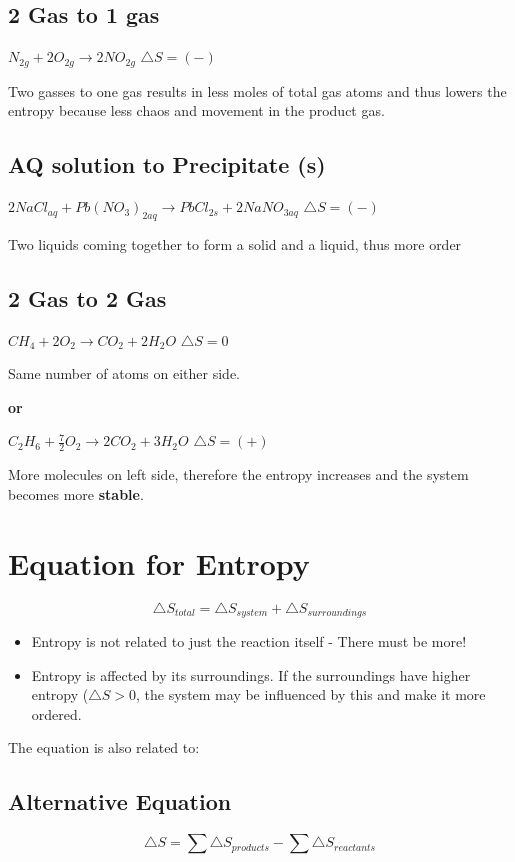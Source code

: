 \documentclass[12pt]{article} %
\begin{document}
\subsection{2 Gas to 1 gas}

$N_{2g} + 2O_{2g} \rightarrow 2NO_{2g}$
$\triangle{S} = (-)$

Two gasses to one gas results in less moles of total gas atoms and thus lowers the entropy because less chaos and movement in the product gas.

\subsection{AQ solution to Precipitate (s)}

$2NaCl_{aq} + Pb(NO_3)_{2aq} \rightarrow PbCl_{2s} + 2NaNO_{3aq}$
$\triangle{S} = (-)$

Two liquids coming together to form a solid and a liquid, thus more order

\subsection{2 Gas to 2 Gas}

$CH_4 + 2O_2 \rightarrow CO_2 + 2H_2O$
$\triangle{S} = 0$

Same number of atoms on either side.

\textbf{or}

$C_2H_6 + \frac{7}{2}O_2 \rightarrow 2CO_2 + 3H_2O$
$\triangle{S} = (+)$

More molecules on left side, therefore the entropy increases and the system becomes more \textbf{stable}.

\pagebreak

\section{Equation for Entropy}

$$\triangle{S}_{total} = \triangle{S}_{system} + \triangle{S}_{surroundings}$$

\begin{itemize}
\item Entropy is not related to just the reaction itself - There must be more!
\item Entropy is affected by its surroundings. If the surroundings have higher entropy ($\triangle{S}>0$, the system may be influenced by this and make it more ordered.
\end{itemize}

The equation is also related to:

\subsection{Alternative Equation}
$$\triangle{S} = \sum{\triangle{S}_{products}} - \sum{\triangle{S}_{reactants}}$$
\end{document}
